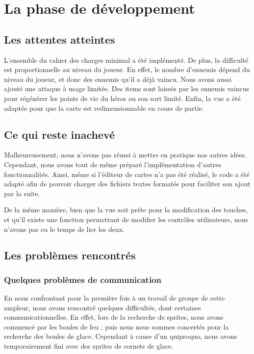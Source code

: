 \section{La phase de développement}

\subsection{Les attentes atteintes}

L'ensemble du cahier des charges minimal a été implémenté. De plus, la difficulté est proportionnelle au niveau du joueur. En effet, le nombre d'ennemis dépend du niveau du joueur, et donc des ennemis qu'il a déjà vaincu. Nous avons aussi ajouté une attaque à usage limitée. Des items sont laissés par les ennemis vaincus pour régénérer les points de vie du héros ou son sort limité. Enfin, la vue a été adaptée pour que la carte est redimensionnable en cours de partie. 

\subsection{Ce qui reste inachevé}

Malheureusement, nous n'avons pas réussi à mettre en pratique nos autres idées. Cependant, nous avons tout de même préparé l'implémentation d'autres fonctionnalités. Ainsi, même si l'éditeur de cartes n'a pas été réalisé, le code a été adapté afin de pouvoir charger des fichiers textes formatés pour faciliter son ajout par la suite. 

De la même manière, bien que la vue soit prête pour la modification des touches, et qu'il existe une fonction permettant de modifier les contrôles utilisateurs, nous n'avons pas eu le temps de lier les deux.

\subsection{Les problèmes rencontrés}

	\subsubsection{Quelques problèmes de communication}
 
En nous confrontant pour la première fois à un travail de groupe de cette ampleur, nous avons rencontré quelques difficultés, dont certaines communicationnelles. En effet, lors de la recherche de sprites, nous avons commencé par les boules de feu ; puis nous nous sommes concertés pour la recherche des boules de glace. Cependant à cause d'un quiproquo, nous avons temporairement fini avec des sprites de cornets de glace. 

